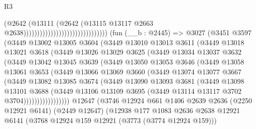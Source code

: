 \begin{lexlean}{R3}
\begin{coremodule}
                                                          (@2642
                                                            (@13111
                                                              (@2642
                                                                (@13115
                                                                  @13117
                                                                  @2663
                                                                  @2638)))))))))))))))))))))))))))))))
    (fun (__b : @2445) =>
    @3027
      (@3451
        @3597
        (@3449
          @13002
          @13005
          @3604
          (@3449
            @13010
            @13013
            @3611
            (@3449
              @13018
              @13021
              @3618
              (@3449
                @13026
                @13029
                @3625
                (@3449
                  @13034
                  @13037
                  @3632
                  (@3449
                    @13042
                    @13045
                    @3639
                    (@3449
                      @13050
                      @13053
                      @3646
                      (@3449
                        @13058
                        @13061
                        @3653
                        (@3449
                          @13066
                          @13069
                          @3660
                          (@3449
                            @13074
                            @13077
                            @3667
                            (@3449
                              @13082
                              @13085
                              @3674
                              (@3449
                                @13090
                                @13093
                                @3681
                                (@3449
                                  @13098
                                  @13101
                                  @3688
                                  (@3449
                                    @13106
                                    @13109
                                    @3695
                                    (@3449 @13114 @13117 @3702 @3704)))))))))))))))))
    @12647
    (@3746
      @12924
      @661
      @1406
      @2639
      @2636
      (@2250 @12921 @6141)
      (@2449 @12647)
      (@12938
        @177
        @1083
        @2636
        @2638
        @12921
        @6141
        (@3768 @12924 @159 @12921 (@3773 (@3774 @12924 @159)))

\end{coremodule}
\end{lexlean}
